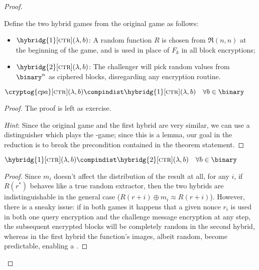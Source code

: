 \begin{proof}
\begin{cryptogame}
        \cseqendloop

        \cseqdelay
        

    \end{cryptogame}

    Define the two hybrid games from the original \cpa{} game as follows:

    \begin{itemize}
        \item $\hybridg{1}[\textsc{ctr}](\lambda, b)$: A random function $R$ is chosen \uar{} from $\mathfrak{R}(n, n)$ at the beginning of the game, and is used in place of $F_k$ in all block encryptions;
        \item $\hybridg{2}[\textsc{ctr}](\lambda, b)$: The challenger will pick random values from $\binary^n$ as ciphered blocks, disregarding any encryption routine.
    \end{itemize}

    \begin{lemma}
        $\cryptog{cpa}[\textsc{ctr}](\lambda, b) \compindist \hybridg{1}[\textsc{ctr}](\lambda, b) \quad \forall b \in \binary$
    \end{lemma}

    \begin{proof} The proof is left as exercise.
        
        \emph{Hint}: Since the original game and the first hybrid are very similar, we can use a distinguisher which plays the \cpa-game; since this is a lemma, our goal in the reduction is to break the precondition contained in the theorem statement.
    \end{proof}

    \begin{lemma}
        $\hybridg{1}[\textsc{ctr}](\lambda, b) \compindist \hybridg{2}[\textsc{ctr}](\lambda, b) \quad \forall b \in \binary$
    \end{lemma}

    \begin{proof}
    
        Since $m_i$ doesn't affect the distribution of the result at all, for any $i$, if $R(r^{*})$ behaves like a true random extractor, then the two hybrids are indistinguishable in the general case ($R(r + i) \oplus m_i \approx R(r + i)$). However, there is a sneaky issue: if in both games it happens that a given nonce $r_i$ is used in both one query encryption and the challenge message encryption at any step, the subsequent encrypted blocks will be completely random in the second hybrid, whereas in the first hybrid the function's images, albeit random, become predictable, enabling a \cpa.


\end{proof}
\end{proof}
